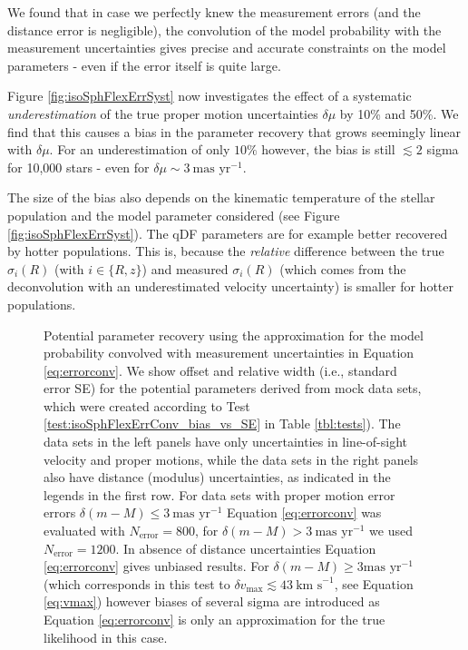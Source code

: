 We found that in case we perfectly knew the measurement errors (and the distance error is negligible), the convolution of the model probability with the measurement uncertainties gives precise and accurate constraints on the model parameters - even if the error itself is quite large.

Figure \ref{fig:isoSphFlexErrSyst} now investigates the effect of a systematic \emph{underestimation} of the true proper motion uncertainties $\delta \mu$ by 10\% and 50\%. We find that this causes a bias in the parameter recovery that grows seemingly linear with $\delta \mu$. For an underestimation of only $10\%$ however, the bias is still $\lesssim 2$ sigma for 10,000 stars \Wilma{[TO DO: Check]} - even for $\delta \mu \sim 3~\text{mas yr}^{-1}$.

The size of the bias also depends on the kinematic temperature of the stellar population and the model parameter considered (see Figure \ref{fig:isoSphFlexErrSyst}). The qDF parameters are for example better recovered by hotter populations. This is, because the \emph{relative} difference between the true $\sigma_i(R)$ (with $i \in \{R,z\}$) and measured $\sigma_i(R)$ (which comes from the deconvolution with an underestimated velocity uncertainty) is smaller for hotter populations. 


\begin{figure}
\caption{Potential parameter recovery using the approximation for the model probability convolved with measurement uncertainties in Equation \ref{eq:errorconv}. We show  \pdf{} offset and relative width (i.e., standard error SE) for the potential parameters derived from mock data sets, which were created according to Test \ref{test:isoSphFlexErrConv_bias_vs_SE} in Table \ref{tbl:tests}). The data sets in the left panels have only uncertainties in line-of-sight velocity and proper motions, while the data sets in the right panels also have distance (modulus) uncertainties, as indicated in the legends in the first row. For data sets with proper motion error errors $\delta(m-M) \leq 3 \ \text{mas yr}^{-1}$ Equation \ref{eq:errorconv} was evaluated with $N_\text{error}=800$, for $\delta(m-M) > 3 \ \text{mas yr}^{-1}$ we used $N_\text{error}=1200$. In absence of distance uncertainties Equation \ref{eq:errorconv} gives unbiased results. For $\delta(m-M) \geq 3 \text{mas yr}^{-1}$ (which corresponds in this test to $\delta v_\text{max} \lesssim 43 \ \text{km s}^{-1}$, see Equation \ref{eq:vmax}) however biases of several sigma are introduced as Equation \ref{eq:errorconv} is only an approximation for the true likelihood in this case. }
\label{fig:isoSphFlexErrConv_bias_vs_SE}
\end{figure}


